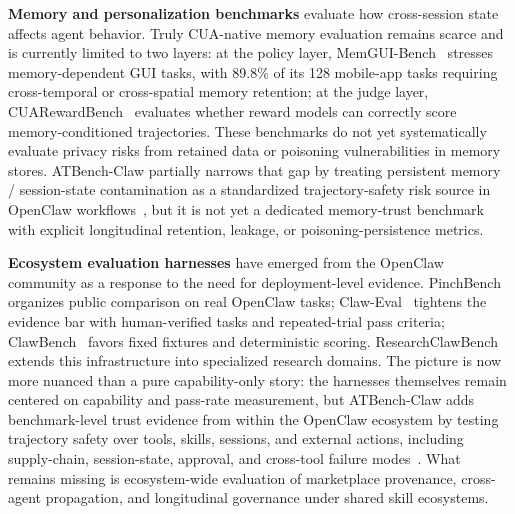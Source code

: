 \textbf{Memory and personalization benchmarks} evaluate how cross-session state affects agent behavior. Truly CUA-native memory evaluation remains scarce and is currently limited to two layers: at the policy layer, MemGUI-Bench~\cite{memguibench2026} stresses memory-dependent GUI tasks, with 89.8\% of its 128 mobile-app tasks requiring cross-temporal or cross-spatial memory retention; at the judge layer, CUARewardBench~\cite{cuarewardbench2025} evaluates whether reward models can correctly score memory-conditioned trajectories. These benchmarks do not yet systematically evaluate privacy risks from retained data or poisoning vulnerabilities in memory stores. ATBench-Claw partially narrows that gap by treating persistent memory / session-state contamination as a standardized trajectory-safety risk source in OpenClaw workflows~\cite{atbenchclaw2026}, but it is not yet a dedicated memory-trust benchmark with explicit longitudinal retention, leakage, or poisoning-persistence metrics.

\textbf{Ecosystem evaluation harnesses} have emerged from the OpenClaw community as a response to the need for deployment-level evidence. PinchBench~\cite{pinchbench2026} organizes public comparison on real OpenClaw tasks; Claw-Eval~\cite{claweval2026} tightens the evidence bar with human-verified tasks and repeated-trial pass criteria; ClawBench~\cite{clawbench2026} favors fixed fixtures and deterministic scoring. ResearchClawBench~\cite{researchclawbench2026} extends this infrastructure into specialized research domains. The picture is now more nuanced than a pure capability-only story: the harnesses themselves remain centered on capability and pass-rate measurement, but ATBench-Claw adds benchmark-level trust evidence from within the OpenClaw ecosystem by testing trajectory safety over tools, skills, sessions, and external actions, including supply-chain, session-state, approval, and cross-tool failure modes~\cite{atbenchclaw2026}. What remains missing is ecosystem-wide evaluation of marketplace provenance, cross-agent propagation, and longitudinal governance under shared skill ecosystems.

